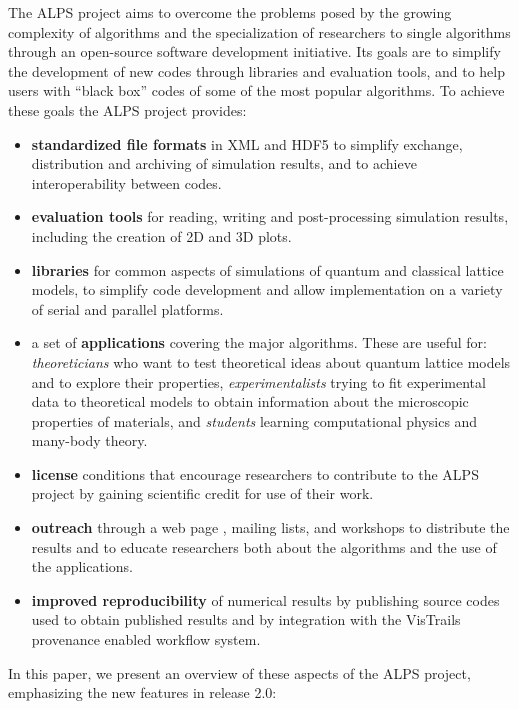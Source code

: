 \documentclass[12pt]{iopart}
\begin{document}
The ALPS project aims to
overcome the problems posed by the growing complexity of algorithms
and the specialization of researchers to single algorithms through
an open-source software development initiative. Its goals are to simplify the development of new codes through libraries and evaluation tools, and to help users with ``black box'' codes of some of the most popular algorithms. To achieve these goals the ALPS project provides:
\begin{itemize}
\item {\bf standardized file formats} in XML \cite{xml} and HDF5 \cite{hdf5} to simplify exchange,
distribution and archiving of simulation results, and to achieve
interoperability between codes.

\item {\bf evaluation tools} for reading, writing and post-processing simulation results, including the creation of 2D and 3D plots.

\item {\bf libraries} for common aspects of
simulations of quantum and classical lattice models, to simplify code
development and allow implementation on a variety of serial and parallel platforms.
\item a set of {\bf applications} covering the major algorithms. These are useful for: 
{\it theoreticians} who want to test theoretical ideas about quantum
lattice models and to explore their properties,  
{\it experimentalists} trying to fit experimental data to theoretical
models to obtain information about the microscopic properties of
materials, and {\it students} learning computational physics and many-body theory.
\item{\bf license} conditions \cite{librarylicense,applicationlicense} that encourage researchers to contribute
to the ALPS project by gaining scientific credit for use of their
work.
\item {\bf outreach} through a web page \cite{alps}, mailing lists, and
workshops to distribute the results and to educate researchers both
about the algorithms and the use of the applications.
\item {\bf improved reproducibility} of numerical results by
publishing source codes used to obtain published results and by integration with the VisTrails \cite{vistrails} provenance enabled workflow system.
\end{itemize}


 In this paper, we present an overview of these
 aspects of the ALPS project, emphasizing the new features in release 2.0:
 
\end{document}
